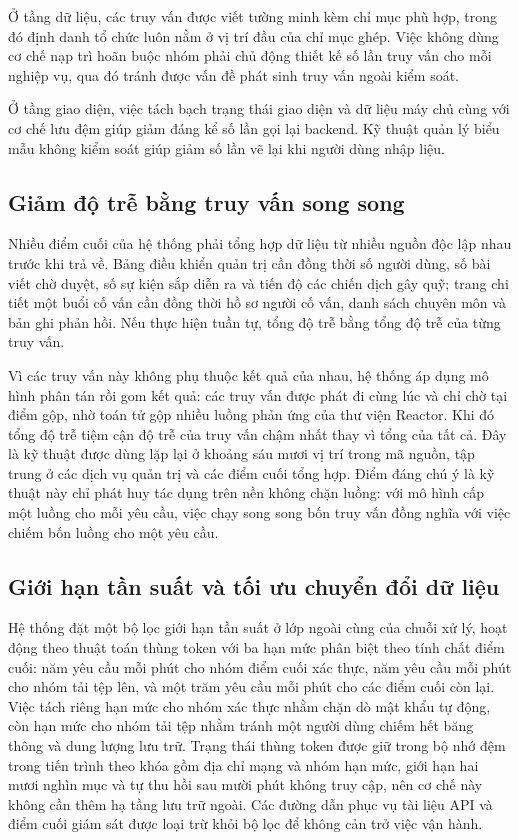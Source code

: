 \documentclass[12pt,a4paper,oneside]{report}
\begin{document}
Ở tầng dữ liệu, các truy vấn được viết tường minh kèm chỉ mục phù hợp, trong đó định danh tổ chức luôn nằm ở vị trí đầu của chỉ mục ghép. Việc không dùng cơ chế nạp trì hoãn buộc nhóm phải chủ động thiết kế số lần truy vấn cho mỗi nghiệp vụ, qua đó tránh được vấn đề phát sinh truy vấn ngoài kiểm soát.

Ở tầng giao diện, việc tách bạch trạng thái giao diện và dữ liệu máy chủ cùng với cơ chế lưu đệm giúp giảm đáng kể số lần gọi lại backend. Kỹ thuật quản lý biểu mẫu không kiểm soát giúp giảm số lần vẽ lại khi người dùng nhập liệu.

\subsection{Giảm độ trễ bằng truy vấn song song}

Nhiều điểm cuối của hệ thống phải tổng hợp dữ liệu từ nhiều nguồn độc lập nhau trước khi trả về. Bảng điều khiển quản trị cần đồng thời số người dùng, số bài viết chờ duyệt, số sự kiện sắp diễn ra và tiến độ các chiến dịch gây quỹ; trang chi tiết một buổi cố vấn cần đồng thời hồ sơ người cố vấn, danh sách chuyên môn và bản ghi phản hồi. Nếu thực hiện tuần tự, tổng độ trễ bằng tổng độ trễ của từng truy vấn.

Vì các truy vấn này không phụ thuộc kết quả của nhau, hệ thống áp dụng mô hình phân tán rồi gom kết quả: các truy vấn được phát đi cùng lúc và chỉ chờ tại điểm gộp, nhờ toán tử gộp nhiều luồng phản ứng của thư viện Reactor. Khi đó tổng độ trễ tiệm cận độ trễ của truy vấn chậm nhất thay vì tổng của tất cả. Đây là kỹ thuật được dùng lặp lại ở khoảng sáu mươi vị trí trong mã nguồn, tập trung ở các dịch vụ quản trị và các điểm cuối tổng hợp. Điểm đáng chú ý là kỹ thuật này chỉ phát huy tác dụng trên nền không chặn luồng: với mô hình cấp một luồng cho mỗi yêu cầu, việc chạy song song bốn truy vấn đồng nghĩa với việc chiếm bốn luồng cho một yêu cầu.

\subsection{Giới hạn tần suất và tối ưu chuyển đổi dữ liệu}

Hệ thống đặt một bộ lọc giới hạn tần suất ở lớp ngoài cùng của chuỗi xử lý, hoạt động theo thuật toán thùng token với ba hạn mức phân biệt theo tính chất điểm cuối: năm yêu cầu mỗi phút cho nhóm điểm cuối xác thực, năm yêu cầu mỗi phút cho nhóm tải tệp lên, và một trăm yêu cầu mỗi phút cho các điểm cuối còn lại. Việc tách riêng hạn mức cho nhóm xác thực nhằm chặn dò mật khẩu tự động, còn hạn mức cho nhóm tải tệp nhằm tránh một người dùng chiếm hết băng thông và dung lượng lưu trữ. Trạng thái thùng token được giữ trong bộ nhớ đệm trong tiến trình theo khóa gồm địa chỉ mạng và nhóm hạn mức, giới hạn hai mươi nghìn mục và tự thu hồi sau mười phút không truy cập, nên cơ chế này không cần thêm hạ tầng lưu trữ ngoài. Các đường dẫn phục vụ tài liệu API và điểm cuối giám sát được loại trừ khỏi bộ lọc để không cản trở việc vận hành.
\end{document}
